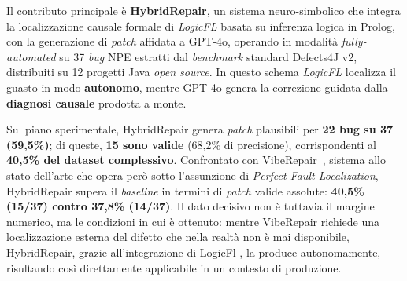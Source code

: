 Il contributo principale è \textbf{HybridRepair}, un sistema neuro-simbolico che integra la
localizzazione causale formale di \textit{LogicFL} \cite{kim2024identifying} basata su inferenza logica in Prolog,
con la generazione di \textit{patch} affidata a GPT-4o, operando in modalità \textit{fully-automated}
su 37 \textit{bug} NPE estratti dal \textit{benchmark} standard Defects4J v2, distribuiti su 12
progetti Java \textit{open source}. In questo schema \textit{LogicFL} localizza il guasto in modo
\textbf{autonomo}, mentre GPT-4o genera la correzione guidata dalla \textbf{diagnosi causale}
prodotta a monte.

Sul piano sperimentale, HybridRepair genera \textit{patch} plausibili per \textbf{22 bug su 37
(59,5\%)}; di queste, \textbf{15 sono valide} (68,2\% di precisione), corrispondenti al
\textbf{40,5\% del dataset complessivo}. Confrontato con VibeRepair~\cite{zhu2026specification},
sistema allo stato dell'arte che opera però sotto l'assunzione di \textit{Perfect Fault
Localization}, HybridRepair supera il \textit{baseline} in termini di \textit{patch} valide
assolute: \textbf{40,5\% (15/37) contro 37,8\% (14/37)}. Il dato decisivo non è tuttavia il
margine numerico, ma le condizioni in cui è ottenuto: mentre VibeRepair richiede una
localizzazione esterna del difetto che nella realtà non è mai disponibile, HybridRepair, grazie 
all'integrazione di LogicFl \cite{kim2024identifying}, la produce autonomamente, risultando così 
direttamente applicabile in un contesto di produzione.
